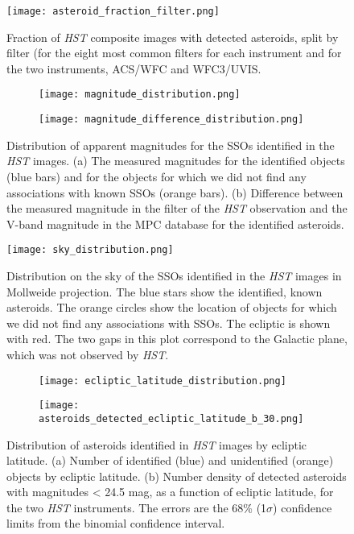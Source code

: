 \documentclass{aa}
\begin{document}
\begin{figure}
   \centering
   \texttt{[image: asteroid\_fraction\_filter.png]}
   \caption{Fraction of \textit{HST} composite images with detected asteroids, split by filter (for the eight most common filters for each instrument and for the two instruments, ACS/WFC and WFC3/UVIS.}
    \label{asteroid_filter}%
\end{figure}


\begin{figure}[h]
     \centering
     \begin{subfigure}[a]{0.5\textwidth}
       \centering
       \texttt{[image: magnitude\_distribution.png]}
     \end{subfigure}
     \hfill
     \begin{subfigure}[b]{0.5\textwidth}
       \centering
       \texttt{[image: magnitude\_difference\_distribution.png]}
     \end{subfigure}
     \caption{Distribution of apparent magnitudes for the SSOs identified in the \textit{HST} images. (a) The measured magnitudes for the identified objects (blue bars) and for the objects for which we did not find any associations with known SSOs (orange bars). (b) Difference between the measured magnitude in the filter of the \textit{HST} observation and the V-band magnitude in the MPC database for the identified asteroids.}
     \label{appmag}
\end{figure}


\begin{figure*}
   \centering
   \texttt{[image: sky\_distribution.png]}
   \caption{Distribution on the sky of the SSOs identified in the \textit{HST} images in Mollweide projection. The blue stars show the identified, known asteroids. The orange circles show the location of objects for which we did not find any associations with SSOs. The ecliptic is shown with red. The two gaps in this plot correspond to the Galactic plane, which was not observed by \textit{HST}.}
    \label{ravsdec}%
\end{figure*}

\begin{figure}[h]
     \centering
     \begin{subfigure}[b]{0.5\textwidth}
       \centering
       \texttt{[image: ecliptic\_latitude\_distribution.png]}
     \end{subfigure}
     \hfill
     \begin{subfigure}[b]{0.5\textwidth}
       \centering
       \texttt{[image: asteroids\_detected\_ecliptic\_latitude\_b\_30.png]}
     \end{subfigure}
     \caption{Distribution of asteroids identified in \textit{HST} images by ecliptic latitude. (a) Number of identified (blue) and unidentified (orange) objects by ecliptic latitude. (b) Number density of detected asteroids with magnitudes < 24.5 mag, as a function of ecliptic latitude, for the two \textit{HST} instruments.  The errors are the 68\% (1$\sigma$) confidence limits from the \citet{Wilson1927} binomial confidence interval.}
     \label{ecliptic_latitude_distribution}
\end{figure}
\end{document}
